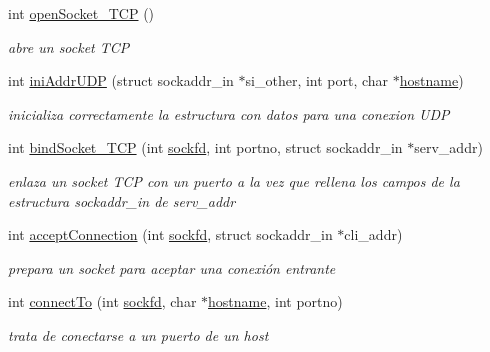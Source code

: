 \begin{DoxyCompactItemize}
\item 
int \hyperlink{_g-2301-05-_p1-socket_8c_ac0a294efde364937332533e4ecd8d121}{open\-Socket\-\_\-\-T\-C\-P} ()
\begin{DoxyCompactList}\small\item\em abre un socket T\-C\-P \end{DoxyCompactList}\item 
int \hyperlink{_g-2301-05-_p1-socket_8c_aac80c67421f8d89f4d5614187dc9cb43}{ini\-Addr\-U\-D\-P} (struct sockaddr\-\_\-in $\ast$si\-\_\-other, int port, char $\ast$\hyperlink{servidor___i_r_c_8c_af203df082d5c6dcaa0c88b07cf86466d}{hostname})
\begin{DoxyCompactList}\small\item\em inicializa correctamente la estructura con datos para una conexion U\-D\-P \end{DoxyCompactList}\item 
int \hyperlink{_g-2301-05-_p1-socket_8c_a5ebfd6c6e35ddca1d74ca6a323cbab3e}{bind\-Socket\-\_\-\-T\-C\-P} (int \hyperlink{_g-2301-05-_p2-user_tools_8h_ad2c8fb3df3a737e0685e902870a611d2}{sockfd}, int portno, struct sockaddr\-\_\-in $\ast$serv\-\_\-addr)
\begin{DoxyCompactList}\small\item\em enlaza un socket T\-C\-P con un puerto a la vez que rellena los campos de la estructura sockaddr\-\_\-in de serv\-\_\-addr \end{DoxyCompactList}\item 
int \hyperlink{_g-2301-05-_p1-socket_8c_ab2765e4508bc50655fe3dd36139f33a5}{accept\-Connection} (int \hyperlink{_g-2301-05-_p2-user_tools_8h_ad2c8fb3df3a737e0685e902870a611d2}{sockfd}, struct sockaddr\-\_\-in $\ast$cli\-\_\-addr)
\begin{DoxyCompactList}\small\item\em prepara un socket para aceptar una conexión entrante \end{DoxyCompactList}\item 
int \hyperlink{_g-2301-05-_p1-socket_8c_a688c9a3a3e37e99d810e8ad63984272d}{connect\-To} (int \hyperlink{_g-2301-05-_p2-user_tools_8h_ad2c8fb3df3a737e0685e902870a611d2}{sockfd}, char $\ast$\hyperlink{servidor___i_r_c_8c_af203df082d5c6dcaa0c88b07cf86466d}{hostname}, int portno)
\begin{DoxyCompactList}\small\item\em trata de conectarse a un puerto de un host \end{DoxyCompactList}\item 

\end{DoxyCompactItemize}
